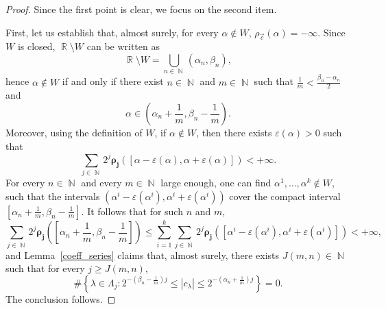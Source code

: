 \documentclass[a4paper,11pt,oneside]{article}
\DeclareMathOperator{\R}{\mathbb{R}}
\DeclareMathOperator{\N}{\mathbb{N}}
\newcommand{\ccint}[1]{\left[{#1}\right]}
\newcommand{\ooint}[1]{\left({#1}\right)}
\newcommand{\modu}[1]{\left\vert{#1}\right\vert}
\theoremstyle{definition}
\theoremstyle{plain}
\begin{document}
\begin{proof}
Since the first point is clear, we focus on the second item. 

First, let us establish that, almost surely, for every $\alpha\notin W$, $\rho_{\vec{c}}(\alpha)=-\infty$. Since $W$ is closed, $\R\setminus W$ can be written as
\[
\R\setminus W=\bigcup_{n\in\N}\ooint{\alpha_n,\beta_n},
\]
hence $\alpha\notin W$ if and only if there exist $n\in\N$ and $m\in\N$ such that $\frac{1}{m}<\frac{\beta_n-\alpha_n}{2}$ and
\[
\alpha\in\ooint{\alpha_n+\frac{1}{m},\beta_n-\frac{1}{m}}.
\]
Moreover, using the definition of $W$, if $\alpha\notin W$, then there exists $\varepsilon(\alpha)>0$ such that
\[
\sum_{j\in\N}2^j\bm{\rho_j}(\ccint{\alpha-\varepsilon(\alpha),\alpha+\varepsilon(\alpha)})<+\infty.
\]
For every $n\in\N$ and every $m\in\N$ large enough, one can find $\alpha^1,\ldots,\alpha^k\notin W$, such that the intervals $\ooint{\alpha^i-\varepsilon\left(\alpha^i\right),\alpha^i+\varepsilon\left(\alpha^i\right)}$ cover the compact interval $\ccint{\alpha_n+\frac{1}{m},\beta_n-\frac{1}{m}}$. It follows that for such $n$ and $m$,
\[
\sum_{j\in\N}2^j\bm{\rho_j}\left(\ccint{\alpha_n+\frac{1}{m},\beta_n-\frac{1}{m}}\right)\leq \sum_{i=1}^{k}\sum_{j\in\N}2^j\bm{\rho_j}\left(\ccint{\alpha^i-\varepsilon(\alpha^i),\alpha^i+\varepsilon(\alpha^i)}\right)<+\infty,
\]
and Lemma~\ref{coeff_series} claims that, almost surely, there exists $J(m,n)\in\N$ such that for every $j\geq J(m,n)$,
\[
\#\left\{\lambda\in\Lambda_j:2^{-\left(\beta_n-\frac{1}{m}\right)j}\leq \modu{c_\lambda} \leq 2^{-\left(\alpha_n+\frac{1}{m}\right)j}\right\}=0.
\]
The conclusion follows.

\medskip


\end{proof}
\end{document}
